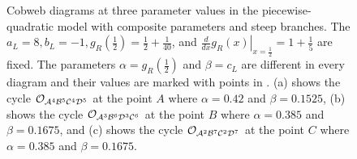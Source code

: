 \begin{figure}
	\centering
	\caption[Cobweb diagrams at three parameter values in the piecewise-quadratic model with composite parameters and steep branches]{
	Cobweb diagrams at three parameter values in the piecewise-quadratic model with composite parameters and steep branches.
	The $a_L = 8, b_L = -1, g_R\left(\frac{1}{2}\right) = \frac{1}{2} + \frac{1}{40}$, and $\left. \frac{d}{dx} g_R(x) \right|_{x = \frac{1}{2}} = 1 + \frac{1}{5}$ are fixed.
	The parameters $\alpha = g_R\left(\frac{1}{2}\right)$ and $\beta = c_L$ are different in every diagram and their values are marked with points in .
	(a) shows the cycle $\mathcal{O}_{\mathcal{A}^4\mathcal{B}^5\mathcal{C}^4\mathcal{D}^5}$ at the point $A$ where $\alpha = 0.42$ and $\beta = 0.1525$,
	(b) shows the cycle $\mathcal{O}_{\mathcal{A}^3\mathcal{B}^6\mathcal{D}^3\mathcal{C}^6}$ at the point $B$ where $\alpha = 0.385$ and $\beta = 0.1675$,
	and (c) shows the cycle $\mathcal{O}_{\mathcal{A}^2\mathcal{B}^7\mathcal{C}^2\mathcal{D}^7}$ at the point $C$ where $\alpha = 0.385$ and $\beta = 0.1675$.
	}
	\label{fig:setup.quad.hyper.1.cobwebs}
\end{figure}

